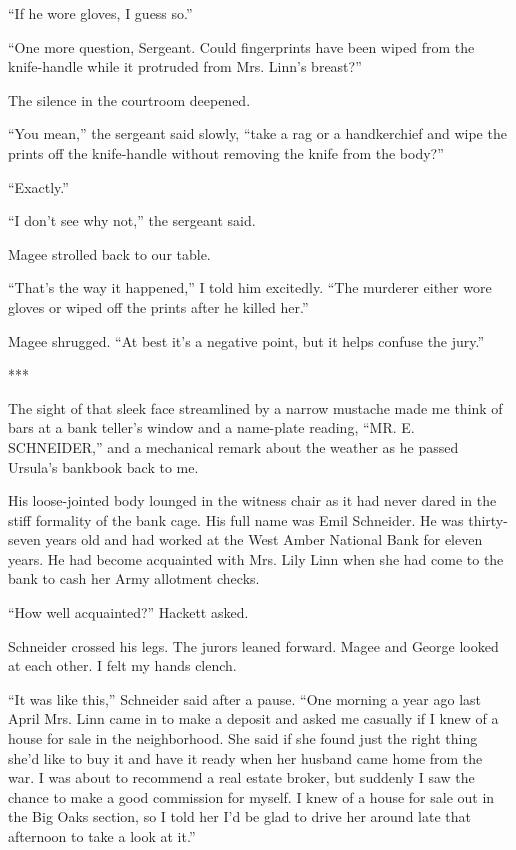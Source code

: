 {“If he wore gloves, I guess so.”

“One more question, Sergeant. Could fingerprints have been wiped from the knife-handle while it protruded from Mrs. Linn’s breast?”

The silence in the courtroom deepened.

“You mean,” the sergeant said slowly, “take a rag or a handkerchief and wipe the prints off the knife-handle without removing the knife from the body?”

“Exactly.”

“I don’t see why not,” the sergeant said.

Magee strolled back to our table.

“That’s the way it happened,” I told him excitedly. “The murderer either wore gloves or wiped off the prints after he killed her.”

Magee shrugged. “At best it’s a negative point, but it helps confuse the jury.”

***

The sight of that sleek face streamlined by a narrow mustache made me think of bars at a bank teller’s window and a name-plate reading, “MR. E. SCHNEIDER,” and a mechanical remark about the weather as he passed Ursula’s bankbook back to me.

His loose-jointed body lounged in the witness chair as it had never dared in the stiff formality of the bank cage. His full name was Emil Schneider. He was thirty-seven years old and had worked at the West Amber National Bank for eleven years. He had become acquainted with Mrs. Lily Linn when she had come to the bank to cash her Army allotment checks.

“How well acquainted?” Hackett asked.

Schneider crossed his legs. The jurors leaned forward. Magee and George looked at each other. I felt my hands clench.

“It was like this,” Schneider said after a pause. “One morning a year ago last April Mrs. Linn came in to make a deposit and asked me casually if I knew of a house for sale in the neighborhood. She said if she found just the right thing she’d like to buy it and have it ready when her husband came home from the war. I was about to recommend a real estate broker, but suddenly I saw the chance to make a good commission for myself. I knew of a house for sale out in the Big Oaks section, so I told her I’d be glad to drive her around late that afternoon to take a look at it.”

}
